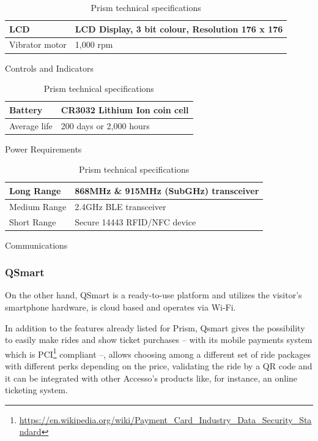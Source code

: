 \begin{table}[H]
    \centering
\begin{subtable}[t]{0.85\textwidth}
    \centering
    \begin{tabular}{|l|l|}
        \hline
        LCD & LCD Display, 3 bit colour, Resolution 176 x 176 \\ \hline
        Vibrator motor & 1,000 rpm \\
        \hline
    \end{tabular}
    \caption{Controls and Indicators}
    \label{tab:ci-tec-spec}
\end{subtable}
\begin{subtable}[t]{0.85\textwidth}
    \centering
    \begin{tabular}{|l|l|}
        \hline
        Battery & CR3032 Lithium Ion coin cell \\ \hline
        Average life & 200 days or 2,000 hours \\
        \hline
    \end{tabular}
    \caption{Power Requirements}
    \label{tab:pr-tec-spec}
\end{subtable}
\begin{subtable}[t]{0.85\textwidth}
    \centering
    \begin{tabular}{|l|l|}
        \hline
        Long Range & 868MHz \& 915MHz (SubGHz) transceiver \\ \hline
        Medium Range & 2.4GHz BLE transceiver \\ \hline
        Short Range & Secure 14443 RFID/NFC device \\
        \hline
    \end{tabular}
    \caption{Communications}
    \label{tab:c-tec-spec}
\end{subtable}
    \caption{Prism technical specifications}
    \label{tab:prism-tech-spec}
\end{table}

\subsubsection*{QSmart}
On the other hand, QSmart is a ready-to-use platform and utilizes the visitor's smartphone hardware, is cloud based
and operates via Wi-Fi.

In addition to the features already listed for Prism, Qsmart gives the possibility to easily make rides and
show ticket purchases -- with its mobile payments system which is
PCI\footnote{\url{https://en.wikipedia.org/wiki/Payment_Card_Industry_Data_Security_Standard}} compliant --,
allows choosing among a different set of ride packages with different perks depending on the price, validating the
ride by a QR code and it can be integrated with other Accesso's products like, for instance, an online ticketing system.


